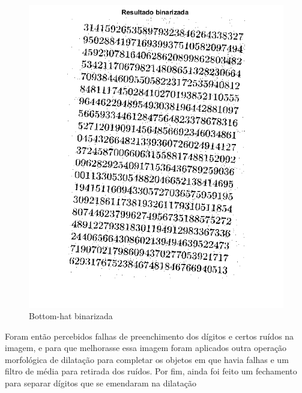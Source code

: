 \documentclass[journal]{IEEEtran}
\begin{document}
\begin{figure}[!htb]
	\centering
	\includegraphics[scale=0.25]{q1-bh2-bin.png}
	\caption{Bottom-hat binarizada}
	\label{Original}
\end{figure}

Foram então percebidos falhas de preenchimento dos dígitos e certos ruídos na imagem, e para que melhorasse essa imagem foram aplicados outra operação morfológica de dilatação para completar os objetos em que havia falhas e um filtro de média para retirada dos ruídos. Por fim, ainda foi feito um fechamento para separar dígitos que se emendaram na dilatação
\end{document}
